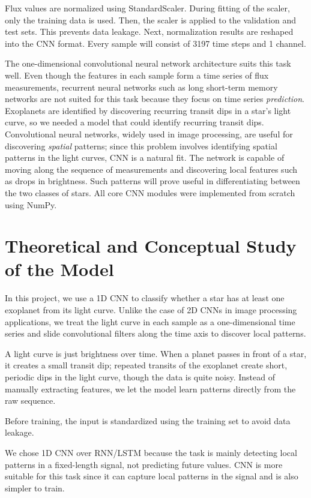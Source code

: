 \documentclass[conference]{IEEEtran}
\begin{document}
Flux values are normalized using StandardScaler. During fitting of the scaler, only the training data is used. Then, the scaler is applied to the validation and test sets. This prevents data leakage. Next, normalization results are reshaped into the CNN format. Every sample will consist of 3197 time steps and 1 channel.

The one-dimensional convolutional neural network architecture suits this task well. Even though the features in each sample form a time series of flux measurements, recurrent neural networks such as long short-term memory networks are not suited for this task because they focus on time series \textit{prediction}. Exoplanets are identified by discovering recurring transit dips in a star's light curve, so we needed a model that could identify recurring transit dips. Convolutional neural networks, widely used in image processing, are useful for discovering \textit{spatial} patterns; since this problem involves identifying spatial patterns in the light curves, CNN is a natural fit. The network is capable of moving along the sequence of measurements and discovering local features such as drops in brightness. Such patterns will prove useful in differentiating between the two classes of stars. All core CNN modules were implemented from scratch using NumPy.

\section{Theoretical and Conceptual Study of the Model}

In this project, we use a 1D CNN to classify whether a star has at least one exoplanet from its light curve. Unlike the case of 2D CNNs in image processing applications, we treat the light curve in each sample as a one-dimensional time series and slide convolutional filters along the time axis to discover local patterns.

A light curve is just brightness over time. When a planet passes in front of a star, it creates a small transit dip; repeated transits of the exoplanet create short, periodic dips in the light curve, though the data is quite noisy. Instead of manually extracting features, we let the model learn patterns directly from the raw sequence.

Before training, the input is standardized using the training set to avoid data leakage.

We chose 1D CNN over RNN/LSTM because the task is mainly detecting local patterns in a fixed-length signal, not predicting future values. CNN is more suitable for this task since it can capture local patterns in the signal and is also simpler to train.
\end{document}
